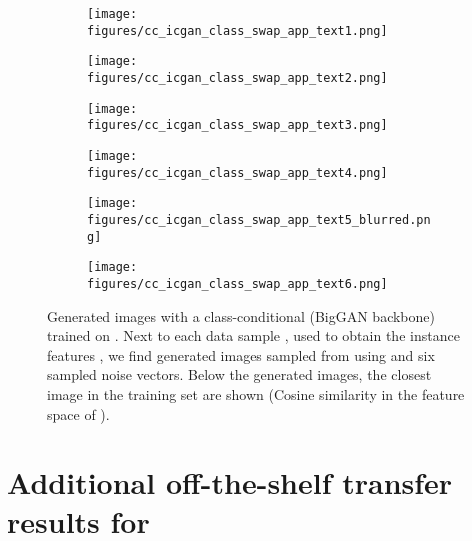  \begin{figure}
\centering
\begin{subfigure}{0.90\textwidth}
 \centering
\texttt{[image: figures/cc\_icgan\_class\_swap\_app\_text1.png]}
\end{subfigure}
\begin{subfigure}{0.90\textwidth}
 \centering
\texttt{[image: figures/cc\_icgan\_class\_swap\_app\_text2.png]}
\end{subfigure}
\begin{subfigure}{0.90\textwidth}
 \centering
\texttt{[image: figures/cc\_icgan\_class\_swap\_app\_text3.png]}
\end{subfigure}
\begin{subfigure}{0.90\textwidth}
 \centering
\texttt{[image: figures/cc\_icgan\_class\_swap\_app\_text4.png]}
\end{subfigure}
\begin{subfigure}{0.90\textwidth}
 \centering
\texttt{[image: figures/cc\_icgan\_class\_swap\_app\_text5\_blurred.png]}
\end{subfigure}
\begin{subfigure}{0.90\textwidth}
 \centering
\texttt{[image: figures/cc\_icgan\_class\_swap\_app\_text6.png]}
\end{subfigure}

 
\caption{Generated  images with a class-conditional \ours (BigGAN backbone) trained on \ImNet. Next to each data sample , used to obtain the instance features , we find generated images sampled from \ours using  and six sampled noise vectors. Below the generated images, the closest image in the \ImNet training set are shown (Cosine similarity in the feature space of ).}
\label{fig:icgan_cc_qualitative_swap_app}
\end{figure}



\section{Additional off-the-shelf transfer results for \ours}
\label{app:add_transfer}
